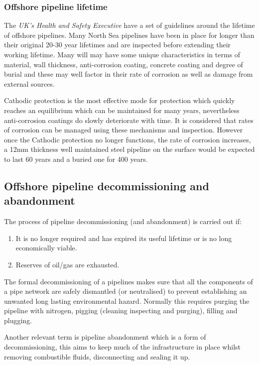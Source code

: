 \documentclass[preprint,12pt]{elsarticle}
\begin{document}
\subsubsection{Offshore pipeline lifetime}

The \textit{UK's Health and Safety Executive} \cite {HSE} have a set of guidelines around the lifetime of offshore pipelines. Many North Sea pipelines have been in place for longer than their original 20-30 year lifetimes and are inspected before extending their working lifetime. Many will may have some unique characteristics in terms of material, wall thickness, anti-corrosion coating, concrete coating and degree of burial and these may well factor in their rate of corrosion as well as damage from external sources. 

Cathodic protection is the most effective mode for protection which quickly reaches an equilibrium which can be maintained for many years, nevertheless anti-corrosion coatings do slowly deteriorate with time. It is considered that rates of corrosion can be managed using these mechanisms and inspection. However once the Cathodic protection no longer functions, the rate of corrosion increases, a 12mm thickness well maintained steel pipeline on the surface would be expected to last 60 years and a buried one for 400 years.

\subsection{Offshore pipeline decommissioning and abandonment}
The process of pipeline decommissioning (and abandonment) is carried out if: 
\begin{enumerate}
  \item It is no longer required and has expired its useful lifetime or is no long economically viable.
  \item Reserves of oil/gas are exhausted.
\end{enumerate}

The formal decommissioning of a pipelines makes sure that all the components of a pipe network are safely dismantled (or neutralised) to prevent establishing an unwanted long lasting environmental hazard. Normally this requires purging the pipeline with nitrogen, pigging (cleaning inspecting and purging), filling and plugging.

Another relevant term is pipeline abandonment which is a form of decommissioning, this aims to keep much of the infrastructure in place whilst removing combustible fluids, disconnecting and sealing it up.
\end{document}
